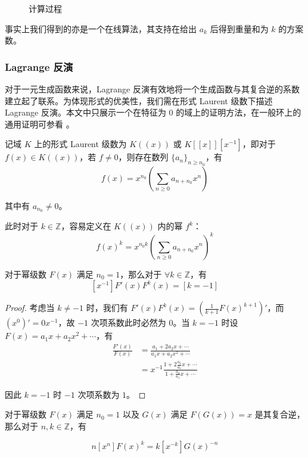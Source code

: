\begin{solution}
\begin{figure}[htbp]
\caption{计算过程}\label{figdiag}
\end{figure}

事实上我们得到的亦是一个在线算法，其支持在给出 $a_k$ 后得到重量和为 $k$ 的方案数。
\end{solution}

\subsubsection{Lagrange 反演}

对于一元生成函数来说，Lagrange 反演有效地将一个生成函数与其复合逆的系数建立起了联系。为体现形式的优美性，我们需在形式 Laurent 级数下描述 Lagrange 反演。本文中只展示一个在特征为 $0$ 的域上的证明方法，在一般环上的通用证明可参看 \cite[Sec. 1.2]{combenum}。

\begin{definition}[形式 Laurent 级数]
记域 $K$ 上的形式 Laurent 级数为 $K((x))$ 或 $K[[x]][x^{-1}]$，即对于 $f(x) \in K((x))$，若 $f\neq 0$，则存在数列 $\{a_n\}_{n\ge n_0}$，有
$$
f(x) = x^{n_0} \left(\sum_{n\ge 0} a_{n+n_0} x^n\right)
$$

其中有 $a_{n_0} \neq 0$。

此时对于 $k\in \mathbb Z$，容易定义在 $K((x))$ 内的幂 $f^k$：
$$
f(x)^k = x^{n_0 k} \left(\sum_{n\ge 0} a_{n+n_0} x^n\right)^k
$$
\end{definition}

\begin{lemma}[形式留数]
对于幂级数 $F(x)$ 满足 $n_0 = 1$，那么对于 $\forall k\in \mathbb Z$，有
$$
[x^{-1}]F'(x)F^k(x)=[k=-1]
$$
\end{lemma}

\begin{proof} 考虑当 $k\neq -1$ 时，我们有 $F'(x)F^k(x)=(\frac 1{k+1} F(x)^{k+1})'$，而 $(x^0)'=0x^{-1}$，故 $-1$ 次项系数此时必然为 $0$。当 $k=-1$ 时设 $F(x) = a_1 x + a_2 x^2 + \cdots$，有
\begin{align*}
\frac{F'(x)}{F(x)} &= \frac{a_1 + 2a_2x + \cdots}{a_1 x + a_2 x^2 + \cdots}\\
&= x^{-1} \frac{1 + 2\frac{a_2}{a_1} x + \cdots}{1 + \frac{a_2}{a_1} x + \cdots}
\end{align*}

因此 $k=-1$ 时 $-1$ 次项系数为 $1$。
\end{proof}
\begin{theorem}[Lagrange 反演]
对于幂级数 $F(x)$ 满足 $n_0 = 1$ 以及 $G(x)$ 满足 $F(G(x))=x$ 是其复合逆，那么对于 $n,k\in \mathbb Z$，有

$$
n[x^n]F(x)^k = k[x^{-k}]G(x)^{-n}
$$
\end{theorem}

